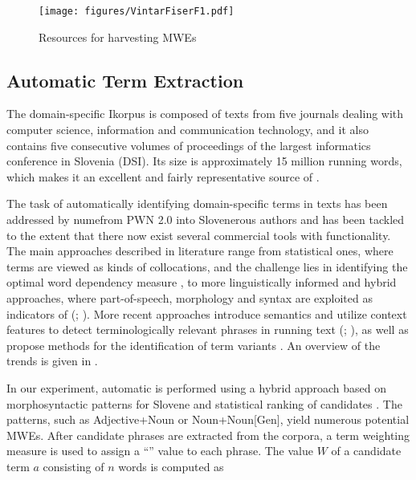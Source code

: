 \documentclass[output=paper]{LSP/langsci}
\begin{document}
\begin{figure}
\texttt{[image: figures/VintarFiserF1.pdf]}
\caption{Resources for harvesting MWEs}
\label{fig:vintar:1}
\end{figure}

\subsection{Automatic Term Extraction}\label{sec:vintar:3.3}

The domain-specific Ikorpus is composed of texts from five journals dealing with computer science, information and communication technology, and it also contains five consecutive volumes of proceedings of the largest informatics conference in Slovenia (DSI). Its size is approximately 15 million running words, which makes it an excellent and fairly representative source of .

The task of automatically identifying domain-specific terms in texts has been addressed by numefrom PWN 2.0 into Slovenerous authors and has been tackled to the extent that there now exist several commercial tools with  functionality. The main approaches described in literature range from statistical ones, where terms are viewed as kinds of collocations, and the challenge lies in identifying the optimal word dependency measure \citep{Dunning1993, Daille1995}, to more linguistically informed and hybrid approaches, where part-of-speech, morphology and syntax are exploited as indicators of  (\citealt{Heid1999}; \citealt{DiasEtAl2000}). More recent approaches introduce semantics and utilize context features to detect terminologically relevant phrases in running text (\citealt{Maynard1999}; \citealt{Gillam2007}), as well as propose methods for the identification of term variants \citep{Jacquemin2001}. An overview of the trends is given in \citet{KageuraEtAl2004}. 

In our experiment, automatic  is performed using a hybrid approach based on morphosyntactic patterns for Slovene and statistical ranking of candidates \citep{Vintar2004, Vintar2009}. The patterns, such as Adjective+Noun or Noun+Noun[Gen], yield numerous potential MWEs. After candidate phrases are extracted from the corpora, a term weighting measure is used to assign a ``'' value to each phrase. The  value $W$ of a candidate term $a$ consisting of $n$ words is computed as 
\end{document}
